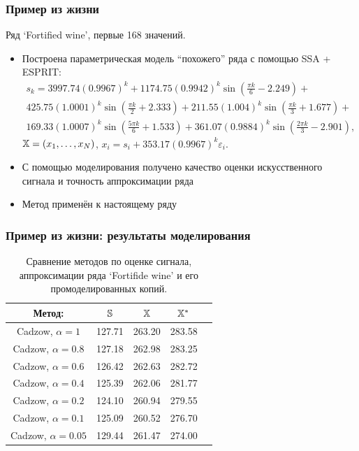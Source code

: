 \documentclass[unicode, notheorems]{beamer}
\begin{document}
\begin{frame}
	\frametitle{Пример из жизни}
    Ряд `Fortified wine', первые 168 значений.
    \begin{itemize}
    	\item Построена параметрическая модель ``похожего'' ряда с помощью SSA + ESPRIT: 
    	\small
    	\begin{multline*} 
    	s_{k} = 3997.74 (0.9967)^k +
    	1174.75 (0.9942)^k \sin(\frac{\pi k}{6} - 2.249) + \\
    	425.75 (1.0001)^k \sin(\frac{\pi k}{2} + 2.333) + 
    	211.55 (1.004)^k \sin(\frac{\pi k}{3} + 1.677) + \\
    	169.33 (1.0007)^k \sin(\frac{5 \pi k}{6} + 1.533) + 
    	361.07 (0.9884)^k \sin(\frac{2 \pi k}{3} - 2.901),
    	\end{multline*}
    	\normalsize
    	$\mathbb{X}=(x_1,\ldots,x_N)$, $x_i=s_i + 353.17 (0.9967)^k \varepsilon_i$.
    	\item С помощью моделирования получено качество оценки искусственного сигнала и точность аппроксимации ряда
    	\item Метод применён к настоящему ряду
    \end{itemize}
\end{frame}

\begin{frame}
	\frametitle{Пример из жизни: результаты моделирования}
\begin{table}
	\caption{Сравнение методов по оценке сигнала, аппроксимации ряда `Fortifide wine' и его промоделированных копий.}
	\label{tab:rltable}
	
	\begin{tabular*}{\textwidth}{@{\extracolsep{\fill}}ccccc}
		\hline
		Метод: & $\mathbb{S}$ & $\mathbb{X}$ & $\mathbb{X}^*$ \\
		\hline
		Cadzow, $\alpha = 1$ & 127.71 & 263.20 & 283.58 \\
		\hline
		Cadzow, $\alpha = 0.8$ & 127.18 & 262.98 & 283.25 \\
		\hline
		Cadzow, $\alpha = 0.6$ & 126.42 & 262.63 & 282.72 \\
		\hline
		Cadzow, $\alpha = 0.4$ & 125.39 & 262.06 & 281.77 \\
		\hline
		Cadzow, $\alpha = 0.2$ & 124.10 & 260.94 & 279.55 \\
		\hline
		Cadzow, $\alpha = 0.1$ & 125.09 & 260.52 & 276.70 \\
		\hline
		Cadzow, $\alpha = 0.05$ & 129.44 & 261.47 & 274.00 \\
		\hline
	\end{tabular*}
\end{table}
\end{frame}
\end{document}
